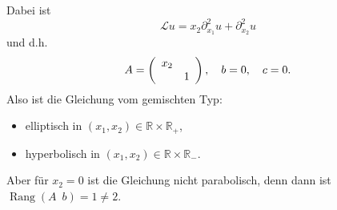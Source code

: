 \documentclass{book}
\newcommand{\tmop}[1]{\ensuremath{\operatorname{#1}}}
\newenvironment{enumerateroman}{\begin{enumerate}[i.] }{\end{enumerate}}
\newenvironment{itemizedot}{\begin{itemize} \renewcommand{\labelitemi}{$\bullet$}\renewcommand{\labelitemii}{$\bullet$}\renewcommand{\labelitemiii}{$\bullet$}\renewcommand{\labelitemiv}{$\bullet$}}{\end{itemize}}
\begin{document}
\begin{example*}
\begin{enumerateroman}
    Dabei ist
    \[ \mathscr{L} u = x_2 \partial_{x_1}^2 u + \partial_{x_2}^2 u \]
    und d.h.
    \[ A = \left(\begin{array}{cc}
         x_2 & \\
         & 1
       \end{array}\right), \text{\quad} b = 0, \text{\quad} c = 0. \]
    {\hspace{1.7em}}Also ist die Gleichung vom gemischten Typ:
    \begin{itemizedot}
      \item elliptisch in $(x_1, x_2) \in \mathbb{R} \times \mathbb{R}_+$,
      
      \item hyperbolisch in $(x_1, x_2) \in \mathbb{R} \times \mathbb{R}_-$.
    \end{itemizedot}
    {\hspace{1.7em}}Aber f{\"u}r $x_2 = 0$ ist die Gleichung nicht
    parabolisch, denn dann ist $\tmop{Rang} \left( A \enspace b \right) = 1
    \neq 2$.
  \end{enumerateroman}
\end{example*}
\end{document}
